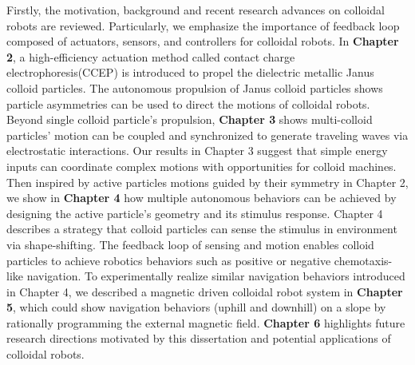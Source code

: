 \begin{titlepage}
Firstly, the motivation, background and recent research  advances on colloidal robots are reviewed. Particularly, we emphasize the importance of feedback
loop composed of actuators, sensors, and controllers for colloidal robots.  In \textbf{Chapter 2},  a high-efficiency actuation method called contact charge electrophoresis(CCEP) is introduced to propel the dielectric metallic Janus colloid particles.  The autonomous propulsion of Janus colloid particles shows particle asymmetries can be used to direct the motions of colloidal robots. Beyond single colloid particle's propulsion, \textbf{Chapter 3} shows multi-colloid particles' motion can be coupled and synchronized to generate  traveling waves via electrostatic interactions.   Our results in Chapter 3 suggest that simple energy inputs can coordinate complex motions with opportunities for colloid machines.  Then inspired by active particles motions guided by their symmetry in Chapter 2, we show in \textbf{Chapter 4} how multiple autonomous behaviors can be achieved by designing the active particle's geometry and its stimulus response. Chapter 4 describes a strategy that colloid particles can sense the stimulus in environment via shape-shifting. The feedback loop of sensing and motion enables colloid particles to achieve robotics behaviors such as positive or negative chemotaxis-like navigation. To experimentally realize similar navigation behaviors introduced in Chapter 4,  we described a magnetic driven colloidal robot system in \textbf{Chapter 5}, which could show navigation behaviors (uphill and downhill) on a slope by rationally  programming the external magnetic field. \textbf{Chapter 6} highlights future research  directions motivated by this dissertation and potential applications of colloidal robots.

\vspace*{\fill}
\end{titlepage}
